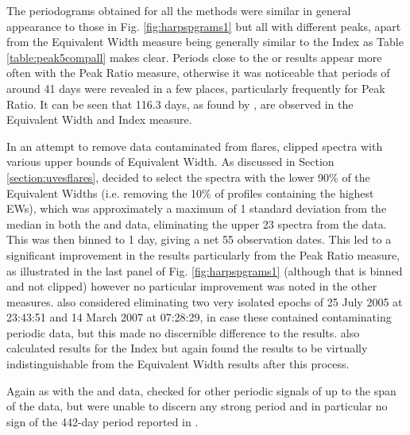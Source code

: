 The periodograms obtained for all the methods were similar in general appearance to those in Fig. \ref{fig:harpspgrams1}
but all with different peaks, apart from the Equivalent Width measure being generally similar to the {\ha} Index as
Table \ref{table:peak5compall} makes clear. Periods close to the {\asas} or {\hst} results appear more often with the
Peak Ratio measure, otherwise it was noticeable that periods of around 41 days were revealed in a few places,
particularly frequently for Peak Ratio. It can be seen that 116.3 days, as found by \citet{suarezmascareno15}, are
observed in the Equivalent Width and {\ha} Index measure.

In an attempt to remove data contaminated from flares, {\Firstp} clipped spectra with various upper bounds of Equivalent
Width. As discussed in Section \ref{section:uvesflares}, {\Firstp} decided to select the spectra with the lower 90\% of
the Equivalent Widths (i.e. removing the 10\% of profiles containing the highest EWs), which was approximately a maximum
of 1 standard deviation from the median in both the {\harps} and {\uves} data, eliminating the upper 23 spectra from the
{\harps} data. This was then binned to 1 day, giving a net 55 observation dates. This led to a significant improvement
in the results particularly from the Peak Ratio measure, as illustrated in the last panel of Fig. \ref{fig:harpspgrams1}
(although that is binned and not clipped) however no particular improvement was noted in the other measures.  {\FirstP}
also considered eliminating two very isolated epochs of 25 July 2005 at 23:43:51 and 14 March 2007 at 07:28:29, in case
these contained contaminating periodic data, but this made no discernible difference to the results. {\FirstP} also
calculated results for the {\ha} Index but again found the results to be virtually indistinguishable from the Equivalent
Width results after this process.

Again as with the {\asas} and {\hst} data, {\Firstp} checked for other periodic signals of up to the span of the data,
but were unable to discern any strong period and in particular no sign of the 442-day period reported in
\citet{cincunegui07}.
